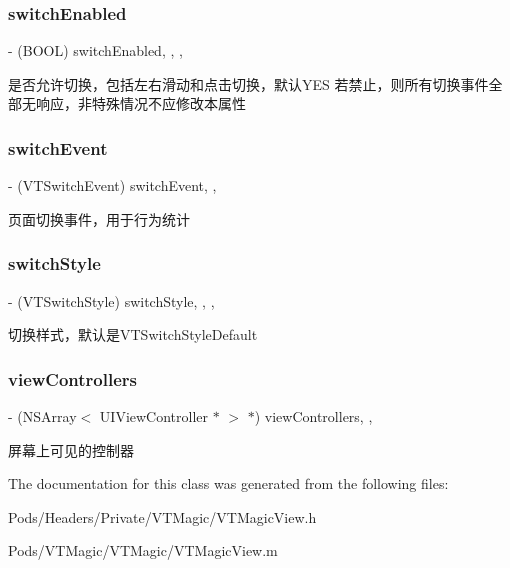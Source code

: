 \subsubsection{\texorpdfstring{switch\+Enabled}{switchEnabled}}
{\footnotesize\ttfamily -\/ (B\+O\+OL) switch\+Enabled\hspace{0.3cm}{\ttfamily [read]}, {\ttfamily [write]}, {\ttfamily [nonatomic]}, {\ttfamily [assign]}}

是否允许切换，包括左右滑动和点击切换，默认\+Y\+ES 若禁止，则所有切换事件全部无响应，非特殊情况不应修改本属性 \mbox{\label{interface_v_t_magic_view_aa87665696c5b4a90a7eb7401185bc319}} 
\subsubsection{\texorpdfstring{switch\+Event}{switchEvent}}
{\footnotesize\ttfamily -\/ (V\+T\+Switch\+Event) switch\+Event\hspace{0.3cm}{\ttfamily [read]}, {\ttfamily [nonatomic]}, {\ttfamily [assign]}}

页面切换事件，用于行为统计 \mbox{\label{interface_v_t_magic_view_aaffade2151ca95e041b443d9386905be}} 
\subsubsection{\texorpdfstring{switch\+Style}{switchStyle}}
{\footnotesize\ttfamily -\/ (V\+T\+Switch\+Style) switch\+Style\hspace{0.3cm}{\ttfamily [read]}, {\ttfamily [write]}, {\ttfamily [nonatomic]}, {\ttfamily [assign]}}

切换样式，默认是\+V\+T\+Switch\+Style\+Default \mbox{\label{interface_v_t_magic_view_a9074039c22076a925f7c1274de4464a8}} 
\subsubsection{\texorpdfstring{view\+Controllers}{viewControllers}}
{\footnotesize\ttfamily -\/ (N\+S\+Array$<$ U\+I\+View\+Controller $\ast$ $>$ $\ast$) view\+Controllers\hspace{0.3cm}{\ttfamily [read]}, {\ttfamily [nonatomic]}, {\ttfamily [strong]}}

屏幕上可见的控制器 

The documentation for this class was generated from the following files\+:\begin{DoxyCompactItemize}
\item 
Pods/\+Headers/\+Private/\+V\+T\+Magic/V\+T\+Magic\+View.\+h\item 
Pods/\+V\+T\+Magic/\+V\+T\+Magic/V\+T\+Magic\+View.\+m\end{DoxyCompactItemize}
